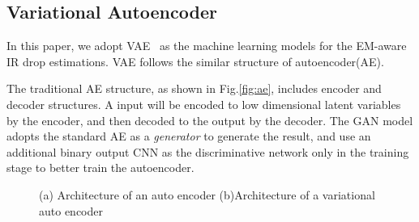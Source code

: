 



\subsection{Variational Autoencoder}
\label{subsec:vae_intro}
In this paper, we adopt VAE~\cite{Diederik:arxiv'22} as the machine learning models for the EM-aware IR drop estimations. 
VAE follows the similar structure of autoencoder(AE).

The traditional AE structure, as shown in Fig.\ref{fig:ae}, includes encoder and decoder structures. A input will be encoded to low dimensional latent variables by the encoder, and then decoded to the output by the decoder.  
The GAN model adopts the standard AE as a \textit{generator} to generate the result, and use an additional binary output CNN as the discriminative network only in the training stage to better train the autoencoder. 


\begin{figure}[htp]
	\centering
	\caption{(a) Architecture of an auto encoder (b)Architecture of a variational auto encoder }
	\label{fig:compare_ae_vae}
\end{figure}


